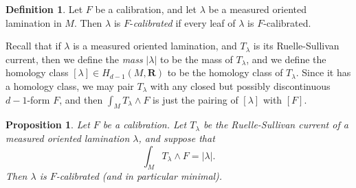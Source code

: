 \documentclass[reqno,11pt]{amsart}
\newcommand{\RR}{\mathbf{R}}
\newcommand{\dfn}[1]{\emph{#1}\index{#1}}
\newtheorem{proposition}[theorem]{Proposition}
\theoremstyle{definition}
\newtheorem{definition}[theorem]{Definition}
\numberwithin{equation}{section}
\begin{document}
\begin{definition}
Let $F$ be a calibration, and let $\lambda$ be a measured oriented lamination in $M$.
Then $\lambda$ is $F$-\dfn{calibrated} if every leaf of $\lambda$ is $F$-calibrated.
\end{definition}

Recall that if $\lambda$ is a measured oriented lamination, and $T_\lambda$ is its Ruelle-Sullivan current, then we define the \dfn{mass} $|\lambda|$ to be the mass of $T_\lambda$, and we define the homology class $[\lambda] \in H_{d - 1}(M, \RR)$ to be the homology class of $T_\lambda$.
Since it has a homology class, we may pair $T_\lambda$ with any closed but possibly discontinuous $d-1$-form $F$, and then $\int_M T_\lambda \wedge F$ is just the pairing of $[\lambda]$ with $[F]$.

\begin{proposition}\label{calibration condition}
Let $F$ be a calibration.
Let $T_\lambda$ be the Ruelle-Sullivan current of a measured oriented lamination $\lambda$, and suppose that 
\begin{equation}\label{calibration by Ruelle Sullivan}
\int_M T_\lambda \wedge F = |\lambda|.
\end{equation}
Then $\lambda$ is $F$-calibrated (and in particular minimal).
\end{proposition}
\end{document}
